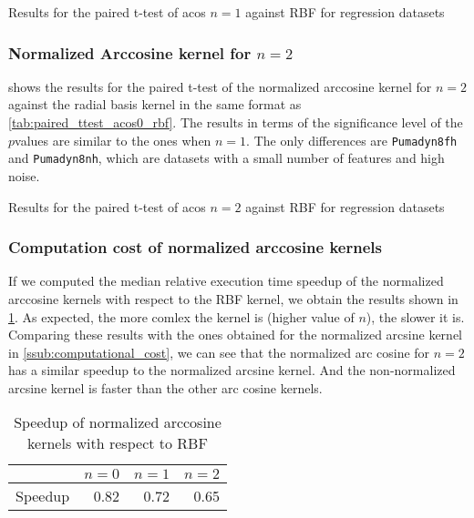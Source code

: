 \begin{table}[H]
    \caption{Results for the paired t-test of acos $n=1$ against RBF for regression datasets}
    \label{tab:paired_ttest_acos1_rbf}
    
\end{table}

\subsubsection{Normalized Arccosine kernel for $n=2$}

 shows the results for the paired t-test of
the normalized arccosine kernel for $n=2$ against the radial basis kernel in the
same format as \cref{tab:paired_ttest_acos0_rbf}. The results in terms of
the significance level of the $p$\textendash{}values are similar to the ones
when $n=1$. The only differences are \texttt{Pumadyn8fh} and \texttt{Pumadyn8nh},
which are datasets with a small number of features and high noise.

\begin{table}[H]
    \caption{Results for the paired t-test of acos $n=2$ against RBF for regression datasets}
    \label{tab:paired_ttest_acos2_rbf}
    
\end{table}

\subsubsection{Computation cost of normalized arccosine kernels}

If we computed the median relative execution time speedup of the normalized
arccosine kernels with respect to the RBF kernel, we obtain the results
shown in \cref{tab:speedup_acos_rbf}. As expected, the more comlex the kernel
is (higher value of $n$), the slower it is. Comparing these results with the
ones obtained for the normalized arcsine kernel in \cref{ssub:computational_cost},
we can see that the normalized arc cosine for $n=2$ has a similar speedup to
the normalized arcsine kernel. And the non-normalized arcsine kernel is faster
than the other arc cosine kernels.

\begin{table}[H]
    \caption{Speedup of normalized arccosine kernels with respect to RBF}
    \label{tab:speedup_acos_rbf}
    \begin{tabular}{lrrr}
        \toprule
        {}      & $n=0$ & $n=1$ & $n=2$ \\
        \midrule
        Speedup & 0.82  & 0.72  & 0.65  \\
        \bottomrule
    \end{tabular}
\end{table}

